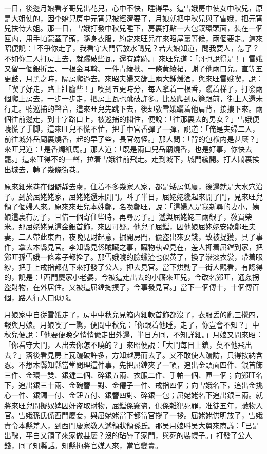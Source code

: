 一日，後邊月娘看孝哥兒出花兒，心中不快，睡得早。這雪娥房中使女中秋兒，原是大姐使的，因李嬌兒房中元宵兒被經濟要了，月娘就把中秋兒與了雪娥，把元宵兒扶侍大姐。那一日，雪娥打發中秋兒睡下，房裏打點一大包釵環頭面，裝在一個匣内，用手帕蒙蓋了頭，隨身衣服，約定來旺兒在來昭屋裏等候，兩個要走。這來昭便說：「不爭你走了，我看守大門管放水鴨兒？若大娘知道，問我要人，怎了？不如你二人打房上去，就躧破些瓦，還有踪跡。」來旺兒道：「哥也說得是！」雪娥又留一個銀折盂、一根金耳斡、一件青綾襖、一條黄綾裙，謝了他兩口兒。直等五更鼓，月黑之時，隔房爬過去。來昭夫婦又篩上兩大鍾煖酒，與來旺雪娥喫，說：「喫了好走，路上壯膽些！」喫到五更時分，每人拿着一根香，躧着梯子，打發兩個爬上房去，一步一步走，把房上瓦也跐破許多。比及爬到房簷跟前，街上人還未行走。聽巡捕的聲音，這來旺兒先跳下去，後却敎雪娥躧着他肩背，接摟下來。兩個往前邊走，到十字路口上，被巡捕的攔住，便說：「往那裏去的男女？」雪娥便唬慌了手脚，這來旺兒不慌不忙，把手中官香彈了一彈，說道：「俺是夫婦二人，前往城外岳廟裏燒香，起的早了些，長官勿怪。」那人問：「背的包袱内是甚麽？」來旺兒道：「是香燭紙馬。」那人道：「既是兩口兒岳廟燒香，也是好事，你快去罷。」這來旺得不的一聲，拉着雪娥往前飛走。走到城下，城門纔開。打人鬧裏挨出城去，轉了幾條街巷。

原來細米巷在個僻靜去䖏，住着不多幾家人家，都是矮房低廈，後邊就是大水穴沿子。到於屈姥姥家，屈姥姥還未開門。呌了半日，屈姥姥纔起來開了門，見來旺兒領了個婦人來。原來來旺兒本姓鄭，名喚鄭旺，說：「這婦人是我新尋的妻小，姨娘這裏有房子，且借一個寄住些時，再尋房子。」遞與屈姥姥三兩銀子，敎買柴米。那屈姥姥見這金銀首飾，來因可疑。他兒子屈鏜，因他娘屈姥姥安歇鄭旺夫妻，二人帶此東西，夜晚見財起意，掘開房門，偸盗出來耍錢，致被捉獲，具了事件，拿去本縣見官。李知縣見係賊贜之事，贜物執證見在，差人押着屈鏜到家，把鄭旺孫雪娥一條索子都拴了。那雪娥唬的臉蠟渣也似黄了，換了滲淡衣裳，帶着眼紗，把手上戒指都勒下來打發了公人，押去見官。當下烘動了一街人觀看，有認得的，說是：「西門慶家小老婆，今被這走出去的小廝來旺兒，今改名鄭旺，通姦拐盗財物，在外居住。又被這屈鏜掏摸了，今事發見官。」當下一個傳十，十個傳百個，路人行人口似飛。

月娘家中自従雪娥走了，房中中秋兒見箱内細軟首飾都沒了，衣服丢的亂三攪四，報與月娘。月娘喫了一驚，便問中秋兒：「你跟着他睡，走了，你豈會不知？」中秋兒便說：「他要便晚夕悄悄偸走出外邊，半日方囘，不知詳細。」月娘又問來昭：「你看守大門，人出去你怎不曉的？」來昭便說：「大門每日上鎖，莫不他飛出去？」落後看見房上瓦躧破許多，方知越房而去了。又不敢使人躧訪，只得按納含忍。不想本縣知縣當堂問理這件事，先把屈鏜夾了一頓，追出金頭面四件、銀首飾三件、金環一雙、銀鍾二個、碎銀五兩、衣服二件、手帕一個、匣一個；向鄭旺名下，追出銀三十兩、金碗簪一對、金僊子一件、戒指四個；向雪娥名下，追出金挑心一件、銀鐲一付、金鈕五付、銀簪四對、碎銀一包；屈姥姥名下追出銀三兩。就將來旺兒問擬奴婢因奸盗取財物，屈鏜係竊盗，俱係雜犯死罪，准徒五年，贜物入官。雪娥孫氏係西門慶妾，與屈姥姥當下都當官拶了一拶。屈姥姥供明放了，雪娥責令本縣差人，到西門慶家敎人遞領狀領孫氏。那吴月娘呌吴大舅來商議：「已是出醜，平白又領了來家做甚麽？沒的玷辱了家門，與死的裝幌子。」打發了公人錢，囘了知縣話。知縣拘將官媒人來，當官變賣。

